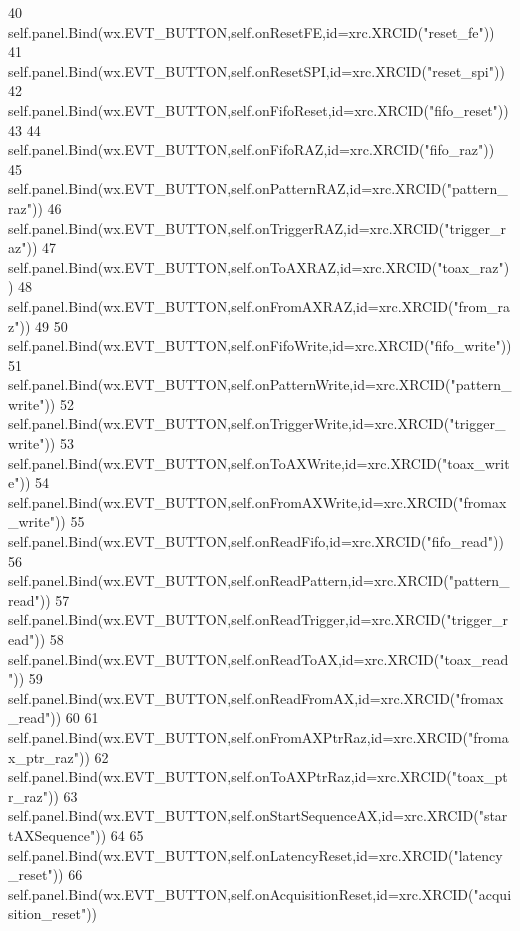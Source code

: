 \begin{DoxyCode}
40         self.panel.Bind(wx.EVT\_BUTTON,self.onResetFE,id=xrc.XRCID(\textcolor{stringliteral}{"reset\_fe"}))
41         self.panel.Bind(wx.EVT\_BUTTON,self.onResetSPI,id=xrc.XRCID(\textcolor{stringliteral}{"reset\_spi"}))
42         self.panel.Bind(wx.EVT\_BUTTON,self.onFifoReset,id=xrc.XRCID(\textcolor{stringliteral}{"fifo\_reset"}))
43 
44         self.panel.Bind(wx.EVT\_BUTTON,self.onFifoRAZ,id=xrc.XRCID(\textcolor{stringliteral}{"fifo\_raz"}))
45         self.panel.Bind(wx.EVT\_BUTTON,self.onPatternRAZ,id=xrc.XRCID(\textcolor{stringliteral}{"pattern\_raz"}))
46         self.panel.Bind(wx.EVT\_BUTTON,self.onTriggerRAZ,id=xrc.XRCID(\textcolor{stringliteral}{"trigger\_raz"}))
47         self.panel.Bind(wx.EVT\_BUTTON,self.onToAXRAZ,id=xrc.XRCID(\textcolor{stringliteral}{"toax\_raz"}))
48         self.panel.Bind(wx.EVT\_BUTTON,self.onFromAXRAZ,id=xrc.XRCID(\textcolor{stringliteral}{"from\_raz"}))
49 
50         self.panel.Bind(wx.EVT\_BUTTON,self.onFifoWrite,id=xrc.XRCID(\textcolor{stringliteral}{"fifo\_write"}))
51         self.panel.Bind(wx.EVT\_BUTTON,self.onPatternWrite,id=xrc.XRCID(\textcolor{stringliteral}{"pattern\_write"}))
52         self.panel.Bind(wx.EVT\_BUTTON,self.onTriggerWrite,id=xrc.XRCID(\textcolor{stringliteral}{"trigger\_write"}))
53         self.panel.Bind(wx.EVT\_BUTTON,self.onToAXWrite,id=xrc.XRCID(\textcolor{stringliteral}{"toax\_write"}))
54         self.panel.Bind(wx.EVT\_BUTTON,self.onFromAXWrite,id=xrc.XRCID(\textcolor{stringliteral}{"fromax\_write"}))
55         self.panel.Bind(wx.EVT\_BUTTON,self.onReadFifo,id=xrc.XRCID(\textcolor{stringliteral}{"fifo\_read"}))
56         self.panel.Bind(wx.EVT\_BUTTON,self.onReadPattern,id=xrc.XRCID(\textcolor{stringliteral}{"pattern\_read"}))
57         self.panel.Bind(wx.EVT\_BUTTON,self.onReadTrigger,id=xrc.XRCID(\textcolor{stringliteral}{"trigger\_read"}))
58         self.panel.Bind(wx.EVT\_BUTTON,self.onReadToAX,id=xrc.XRCID(\textcolor{stringliteral}{"toax\_read"}))
59         self.panel.Bind(wx.EVT\_BUTTON,self.onReadFromAX,id=xrc.XRCID(\textcolor{stringliteral}{"fromax\_read"}))
60 
61         self.panel.Bind(wx.EVT\_BUTTON,self.onFromAXPtrRaz,id=xrc.XRCID(\textcolor{stringliteral}{"fromax\_ptr\_raz"}))
62         self.panel.Bind(wx.EVT\_BUTTON,self.onToAXPtrRaz,id=xrc.XRCID(\textcolor{stringliteral}{"toax\_ptr\_raz"}))
63         self.panel.Bind(wx.EVT\_BUTTON,self.onStartSequenceAX,id=xrc.XRCID(\textcolor{stringliteral}{"startAXSequence"}))
64 
65         self.panel.Bind(wx.EVT\_BUTTON,self.onLatencyReset,id=xrc.XRCID(\textcolor{stringliteral}{"latency\_reset"}))
66         self.panel.Bind(wx.EVT\_BUTTON,self.onAcquisitionReset,id=xrc.XRCID(\textcolor{stringliteral}{"acquisition\_reset"}))

\end{DoxyCode}
